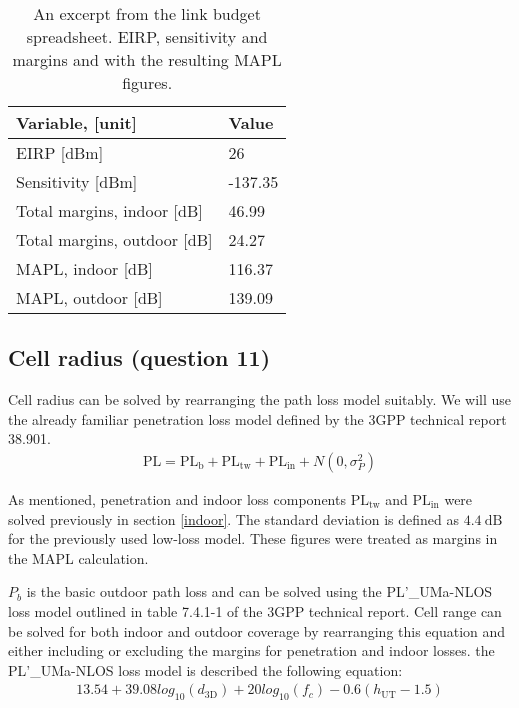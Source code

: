 \documentclass{article}
\begin{document}
\begin{table}[!htb]
    \centering
    \begin{tabular}{|l|l|}                                          \hline
    \textbf{Variable, [unit]}                 & \textbf{Value}   \\ \hline
    EIRP {[}dBm{]}                            & 26               \\ \hline
    Sensitivity {[}dBm{]}                     & -137.35          \\ \hline
    Total margins, indoor {[}dB{]}            & 46.99            \\ \hline
    Total margins, outdoor {[}dB{]}           & 24.27            \\ \hline
    MAPL, indoor {[}dB{]}                     & 116.37           \\ \hline
    MAPL, outdoor {[}dB{]}                    & 139.09           \\ \hline
    \end{tabular}
    \caption{An excerpt from the link budget spreadsheet. EIRP, sensitivity and margins and with the resulting MAPL figures.}
    \label{tab:mapl}
\end{table}

\subsection{Cell radius (question 11)}
Cell radius can be solved by rearranging the path loss model suitably. We will use the already familiar penetration loss model defined by the 3GPP technical report 38.901.
\begin{align*}
    \mathrm{PL} = \mathrm{PL_b} + \mathrm{PL_{tw}} + \mathrm{PL_{in}} + N(0, \sigma^2_P)
\end{align*}

As mentioned, penetration and indoor loss components \(\mathrm{PL_{tw}}\) and \(\mathrm{PL_{in}}\) were solved previously in section \ref{indoor}. The standard deviation is defined as \(\SI{4.4}{\deci\bel}\) for the previously used low-loss model. These figures were treated as margins in the MAPL calculation.

\(P_b\) is the basic outdoor path loss and can be solved using the PL’\_UMa-NLOS loss model outlined in table 7.4.1-1 of the 3GPP technical report. Cell range can be solved for both indoor and outdoor coverage by rearranging this equation and either including or excluding the margins for penetration and indoor losses. the PL’\_UMa-NLOS loss model is described the following equation:
\begin{gather*}
    13.54 + 39.08 log_{10}(d_{\mathrm{3D}}) + 20 log_{10}(f_c)
    -0.6(h_{\mathrm{UT}}-1.5)
\end{gather*}
\end{document}
